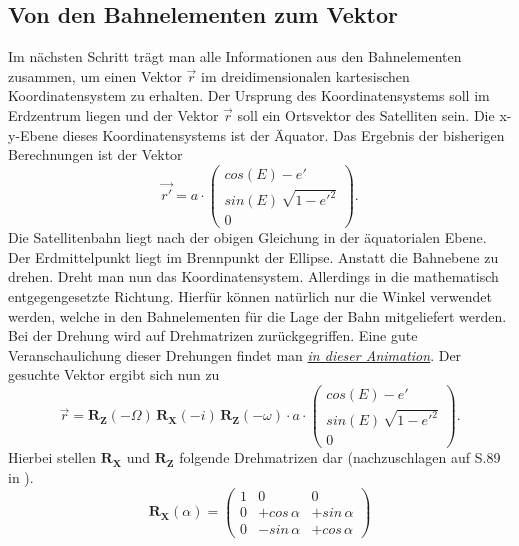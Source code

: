 \subsection{Von den Bahnelementen zum Vektor}
Im nächsten Schritt trägt man alle Informationen aus den Bahnelementen zusammen, um einen Vektor \ensuremath{\vec{r}} im dreidimensionalen kartesischen Koordinatensystem zu erhalten. Der Ursprung des Koordinatensystems soll im Erdzentrum liegen und der Vektor \ensuremath{\vec{r}} soll ein Ortsvektor des Satelliten sein. Die x-y-Ebene dieses Koordinatensystems ist der Äquator. Das Ergebnis der bisherigen Berechnungen ist der Vektor
\begin{equation}
	\vec{r'}=a\cdot\left(\begin{array}{c}cos(E)-e'\\ sin(E)\,\sqrt{1-e'^2} \\0\end{array}\right).
\end{equation}
Die Satellitenbahn liegt nach der obigen Gleichung in der äquatorialen Ebene. Der Erdmittelpunkt liegt im Brennpunkt der Ellipse. Anstatt die Bahnebene zu drehen. Dreht man nun das Koordinatensystem. Allerdings in die mathematisch entgegengesetzte Richtung. Hierfür können natürlich nur die Winkel verwendet werden, welche in den Bahnelementen für die Lage der Bahn mitgeliefert werden. Bei der Drehung wird auf Drehmatrizen zurückgegriffen. Eine gute Veranschaulichung dieser Drehungen findet man \href{https://www.youtube.com/watch?v=QZrYaKwZwhI}{\textit{in dieser Animation}}. Der gesuchte Vektor ergibt sich nun zu
\begin{equation}
	\vec{r}=\mathbf{R_Z}(-\Omega)\,\mathbf{R_X}(-i)\,\mathbf{R_Z}(-\omega)\cdot a\cdot\left(\begin{array}{c}cos(E)-e'\\ sin(E)\,\sqrt{1-e'^2} \\0\end{array}\right).
\end{equation}  
Hierbei stellen \ensuremath{\mathbf{R_X}} und \ensuremath{\mathbf{R_Z}} folgende Drehmatrizen dar (nachzuschlagen auf S.89 in \cite{HandRaum}). 
\begin{equation}
\mathbf{R_X}(\alpha) = 
	\left(
		\begin{array}{ccc}
			1 & 0 & 0 \\
			0 & +cos\,\alpha & +sin\,\alpha\\
			0 & -sin\,\alpha & +cos\,\alpha
		\end{array}
	\right)
\end{equation}
